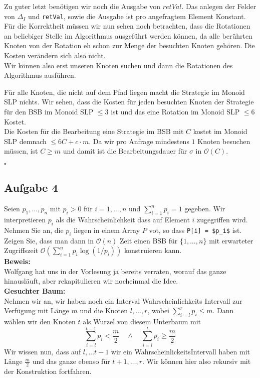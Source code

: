 \documentclass[11pt,a4paper,ngerman]{article}
\begin{document}
Zu guter letzt benötigen wir noch die Ausgabe von $retVal$. Das anlegen der Felder von $\Delta_I$ und \lstinline|retVal|, sowie die
Ausgabe ist pro angefragtem Element Konstant. \\

Für die Korrektheit müssen wir nun sehen noch betrachten, dass die Rotationen an beliebiger Stelle im Algorithmus ausgeführt werden können,
da alle berührten Knoten von der Rotation eh schon zur Menge der besuchten Knoten gehören. Die Kosten verändern sich also nicht.\\
Wir können also erst unseren Knoten suchen und dann die Rotationen des Algorithmus ausführen.

Für alle Knoten, die nicht auf dem Pfad liegen macht die Strategie im Monoid SLP nichts. Wir sehen, dass die Kosten für jeden besuchten Knoten
der Strategie für den BSB im Monoid SLP $\leq 3$ ist und das eine Rotation im Monoid SLP $\leq 6$ Kostet.\\

Die Kosten für die Bearbeitung eine Strategie im BSB mit $C$ kostet im Monoid SLP demnach $\leq 6 C + c \cdot m$. Da wir pro Anfrage
mindestens $1$ Knoten besuchen müssen, ist $C \geq m$ und damit ist die Bearbeitungsdauer für $\sigma$ in $\mathcal{O}(C)$.

\mbox{}\hfill$\square$

\subsection*{Aufgabe 4}

Seien $p_1, \ldots, p_n$ mit $p_i > 0$ für $i=1, \ldots, n$ und $\sum_{i=1}^n p_i = 1$ gegeben. Wir interpretieren $p_i$ als die Wahrscheinlichkeit dass auf Element $i$ zugegriffen wird. Nehmen Sie an, die $p_i$ liegen in einem Array $P$ vot, so dass \lstinline|P[i] = $p_i$| ist. Zeigen Sie, dass man dann 
in $\mathcal{O}(n)$ Zeit einen BSB für $\{1, \ldots, n\}$ mit erwarteter Zugriffszeit $\mathcal{O} \left( \sum_{i=1}^n p_i \log(1/p_i)\right)$ konstruieren kann.\\

\noindent\textbf{Beweis:}\\

Wolfgang hat uns in der Vorlesung ja bereits verraten, worauf das ganze hinausläuft, aber rekapitulieren wir nocheinmal die Idee.\\

\noindent\textbf{Gesuchter Baum:}\\
Nehmen wir an, wir haben noch ein Interval Wahrscheinlichkeits Intervall zur Verfügung mit Länge $m$ und die Knoten $l, \ldots, r$,
wobei $\sum_{i=l}^r p_i \leq m$.
Dann wählen wir den Knoten $t$ als Wurzel von diesem Unterbaum mit
$$
	\sum_{i=l}^{t-1} p_i < \frac{m}{2} \quad \land \quad \sum_{i=l}^t p_i \geq \frac{m}{2}
$$
Wir wissen nun, dass auf $l, \ldots t-1$ wir ein WahrscheinlickeitsIntervall haben mit Länge $\frac{m}{2}$ und das ganze ebenso für $t+1,\ldots,r$.
Wir können hier also rekursiv mit der Konstruktion fortfahren.
\end{document}
